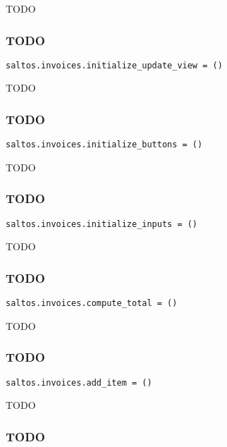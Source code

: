 \documentclass[a4paper]{article}
\begin{document}
TODO

\hypertarget{toc76}{}
\subsubsection{TODO}

\begin{lstlisting}
saltos.invoices.initialize_update_view = ()
\end{lstlisting}

TODO

\hypertarget{toc77}{}
\subsubsection{TODO}

\begin{lstlisting}
saltos.invoices.initialize_buttons = ()
\end{lstlisting}

TODO

\hypertarget{toc78}{}
\subsubsection{TODO}

\begin{lstlisting}
saltos.invoices.initialize_inputs = ()
\end{lstlisting}

TODO

\hypertarget{toc79}{}
\subsubsection{TODO}

\begin{lstlisting}
saltos.invoices.compute_total = ()
\end{lstlisting}

TODO

\hypertarget{toc80}{}
\subsubsection{TODO}

\begin{lstlisting}
saltos.invoices.add_item = ()
\end{lstlisting}

TODO

\hypertarget{toc81}{}
\subsubsection{TODO}
\end{document}
